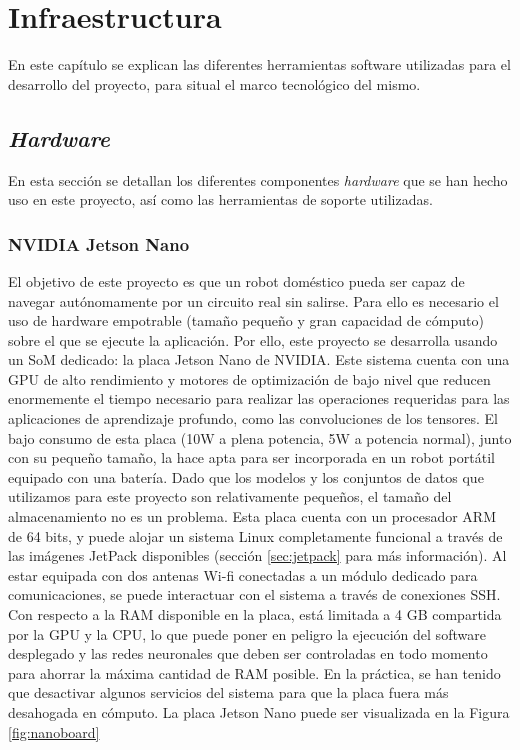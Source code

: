 \chapter{Infraestructura}

En este capítulo se explican las diferentes herramientas software utilizadas para el desarrollo del proyecto, para situal el marco tecnológico del mismo.

\section{\textit{Hardware}}

En esta sección se detallan los diferentes componentes \textit{hardware} que se han hecho uso en este proyecto, así como las herramientas de soporte utilizadas.

\subsection{NVIDIA Jetson Nano}

El objetivo de este proyecto es que un robot doméstico pueda ser capaz de navegar autónomamente por un circuito real sin salirse. Para ello es necesario el uso de hardware empotrable (tamaño pequeño y gran capacidad de cómputo) sobre el que se ejecute la aplicación. Por ello, este proyecto se desarrolla usando un SoM dedicado: la placa Jetson Nano de NVIDIA. Este sistema cuenta con una GPU de alto rendimiento y motores de optimización de bajo nivel que reducen enormemente el tiempo necesario para realizar las operaciones requeridas para las aplicaciones de aprendizaje profundo, como las convoluciones de los tensores. El bajo consumo de esta placa (10W a plena potencia, 5W a potencia normal), junto con su pequeño tamaño, la hace apta para ser incorporada en un robot portátil equipado con una batería. 
Dado que los modelos y los conjuntos de datos que utilizamos para este proyecto son relativamente pequeños, el tamaño del almacenamiento no es un problema. Esta placa cuenta con un procesador ARM de 64 bits, y puede alojar un sistema Linux completamente funcional a través de las imágenes JetPack disponibles (sección \ref{sec:jetpack} para más información). Al estar equipada con dos antenas Wi-fi conectadas a un módulo dedicado para comunicaciones, se puede interactuar con el sistema a través de conexiones SSH. Con respecto a la RAM disponible en la placa, está limitada a 4 GB compartida por la GPU y la CPU, lo que puede poner en peligro la ejecución del software desplegado y las redes neuronales que deben ser controladas en todo momento para ahorrar la máxima cantidad de RAM posible. En la práctica, se han tenido que desactivar algunos servicios del sistema para que la placa fuera más desahogada en cómputo. La placa Jetson Nano puede ser visualizada en la Figura \ref{fig:nanoboard}

